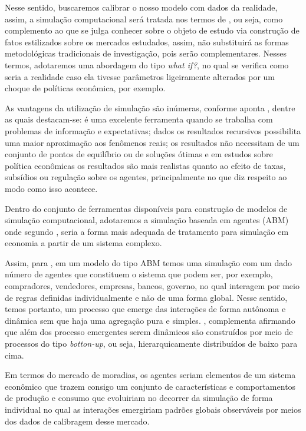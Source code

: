 Nesse sentido, buscaremos calibrar o nosso modelo com dados da realidade, assim, a simulação computacional será tratada nos termos de , ou seja, como complemento ao que se julga conhecer sobre o objeto de estudo via construção de fatos estilizados sobre os mercados estudados, assim, não substituirá as formas metodológicas tradicionais de investigação, pois serão complementares. Nesses termos, adotaremos uma abordagem do tipo \textit{what if?}, no qual se verifica como seria a realidade caso ela tivesse parâmetros ligeiramente alterados por um choque de políticas econômica, por exemplo.

As vantagens da utilização de simulação são inúmeras, conforme aponta  , dentre as quais destacam-se: é uma excelente ferramenta quando se trabalha com problemas de informação e expectativas; dados os resultados recursivos possibilita uma maior aproximação aos fenômenos reais; os resultados não necessitam de um conjunto de pontos de equilíbrio ou de soluções ótimas e em estudos sobre política econômicas os resultados são mais realistas quanto ao efeito de taxas, subsídios ou regulação sobre os agentes, principalmente no que diz respeito ao modo como isso acontece.


Dentro do conjunto de ferramentas disponíveis para construção de modelos de simulação computacional, adotaremos a simulação baseada em agentes (ABM) onde segundo , seria a forma mais adequada de tratamento para simulação em economia a partir de um sistema complexo.

Assim, para , em um modelo do tipo ABM temos uma simulação com um dado número de agentes que constituem o sistema que podem ser, por exemplo, compradores, vendedores, empresas, bancos, governo, no qual interagem por meio de regras definidas individualmente e não de uma forma global. Nesse sentido, temos portanto, um processo que emerge das interações de forma autônoma e dinâmica sem que haja uma agregação pura e simples. , complementa afirmando que além dos processo emergentes serem dinâmicos são construídos por meio de processos do tipo \textit{botton-up}, ou seja, hierarquicamente distribuídos de baixo para cima.

Em termos do mercado de moradias, os agentes seriam elementos de um sistema econômico que trazem consigo um conjunto de características e comportamentos de produção e consumo que evoluiriam no decorrer da simulação de forma individual no qual as interações emergiriam padrões globais observáveis por meios dos dados de calibragem desse mercado. 

